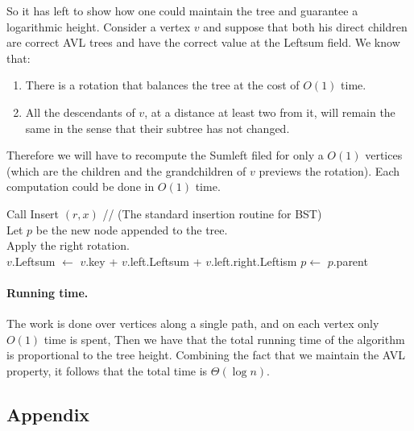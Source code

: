 So it has left to show how one could maintain the tree and guarantee a logarithmic height. Consider a vertex $v$ and suppose that both
his direct children are correct AVL trees and have the correct value at the Leftsum field. We know that:
\begin{enumerate}
  \item There is a rotation that balances the tree at the cost of $O(1)$ time.
  \item All the descendants of $v$, at a distance at least two from it,  will remain the same in the sense that their subtree has not changed. 
\end{enumerate}
Therefore we will have to recompute the Sumleft filed for only a $O(1)$ vertices (which are the children and the grandchildren of $v$ previews the rotation). 
Each computation could be done in $O(1)$ time. 



  \begin{algorithm}[H]
    Call Insert $(r,x)$ // (The standard insertion routine for BST) \\  
    Let $p$ be the new node appended to the tree. \\
     {
      Apply the right rotation. \\
       {
	$v$.Leftsum $\leftarrow$ $v$.key + $v$.left.Leftsum + $v$.left.right.Leftism 		
      }
      $p \leftarrow$ $p$.parent \\  
    }
  \end{algorithm}


\paragraph{Running time.} The work is done over vertices along a single path, and on each vertex only $O(1)$ time 
is spent, Then we have that the total running time of the algorithm is proportional to the tree height. 
Combining the fact that we maintain the AVL property, it follows that the total time is $\Theta\left( \log n \right)$.  




\subsection*{Appendix}
